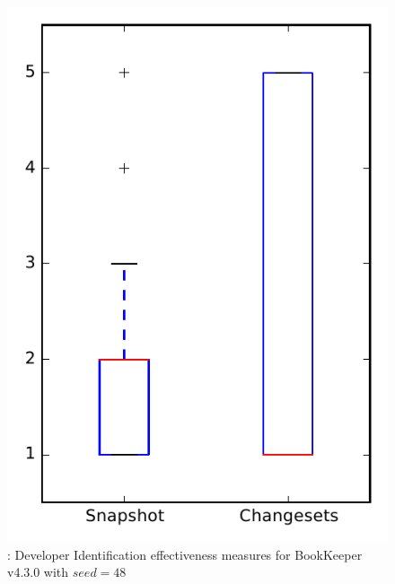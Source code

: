 
\begin{figure}
\centering
\includegraphics[height=0.4\textheight]{figures/dit_seed/rq1_bookkeeper_48}
\caption{\rtwo: Developer Identification effectiveness measures for BookKeeper v4.3.0 with $seed=48$}
\label{fig:dit_seed:rq1:bookkeeper}
\end{figure}
